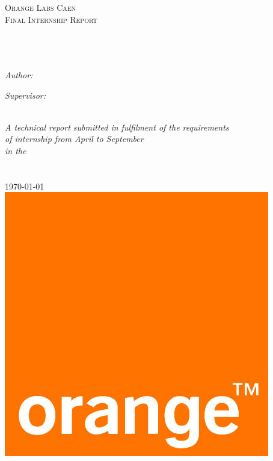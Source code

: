 \documentclass[11pt, oneside]{Thesis} %
\begin{document}
\begin{titlepage}
\begin{center}

\textsc{\LARGE Orange Labs Caen}\\[1.5cm] %
\textsc{\Large Final Internship Report}\\[0.5cm] %

\HRule \\[0.4cm] %
{\huge \bfseries \ttitle}\\[0.4cm] %
\HRule \\[1.5cm] %
 
\begin{minipage}{0.4\textwidth}
\begin{flushleft} \large
\emph{Author:}\\
{\authornames} %
\end{flushleft}
\end{minipage}
\begin{minipage}{0.4\textwidth}
\begin{flushright} \large
\emph{Supervisor:} \\
{\supname} %
\end{flushright}
\end{minipage}\\[3cm]
 
\large \textit{A technical report submitted in fulfilment of the requirements\\ of internship from April to September}\\[0.3cm] %
\textit{in the}\\[0.4cm]
\groupname\\\deptname\\[2cm] %
 
{\large \today}\\[2cm] %
\includegraphics[scale=0.1]{Figures/orange.png} %
 

\end{center}
\end{titlepage}
\end{document}
